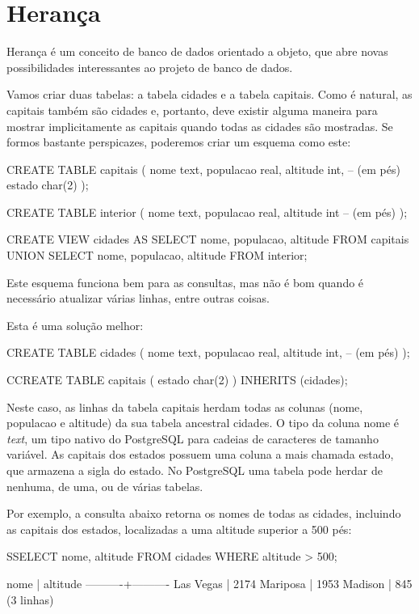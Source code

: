 \section{Herança}\setcounter{SteP}{1}
Herança é um conceito de banco de dados orientado a objeto, que abre novas possibilidades interessantes ao projeto de banco de dados.

Vamos criar duas tabelas: a tabela cidades e a tabela capitais. Como é natural, as capitais também são cidades e, portanto, deve existir alguma maneira para mostrar implicitamente as capitais quando todas as cidades são mostradas. Se formos bastante perspicazes, poderemos criar um esquema como este:
\begin{BoxVerbatim}
CREATE TABLE capitais (
   nome       text,
   populacao  real,
   altitude   int,    -- (em pés)
   estado     char(2)
);

CREATE TABLE interior (
   nome       text,
   populacao  real,
   altitude   int     -- (em pés)
);

CREATE VIEW cidades AS
   SELECT nome, populacao, altitude FROM capitais
      UNION
   SELECT nome, populacao, altitude FROM interior;
\end{BoxVerbatim}

Este esquema funciona bem para as consultas, mas não é bom quando é necessário atualizar várias linhas, entre outras coisas.

Esta é uma solução melhor:

\begin{BoxVerbatim}
CREATE TABLE cidades (
   nome       text,
   populacao  real,
   altitude   int,    -- (em pés)
);

CCREATE TABLE capitais (
  estado      char(2)
) INHERITS (cidades);
\end{BoxVerbatim}

Neste caso, as linhas da tabela capitais herdam todas as colunas (nome, populacao e altitude) da sua tabela ancestral cidades. O tipo da coluna nome é {\it text},
um tipo nativo do PostgreSQL para cadeias de caracteres de tamanho variável. As capitais dos estados possuem uma coluna a mais chamada estado, que armazena a sigla do estado. No PostgreSQL uma tabela pode herdar de nenhuma, de uma, ou de várias tabelas.

Por exemplo, a consulta abaixo retorna os nomes de todas as cidades, incluindo as capitais dos estados, localizadas a uma altitude superior a 500 pés:
\begin{BoxVerbatim}
SSELECT nome, altitude
  FROM cidades
  WHERE altitude > 500;


  nome    | altitude
----------+----------
Las Vegas |     2174
Mariposa  |     1953
Madison   |      845
(3 linhas)
\end{BoxVerbatim}

